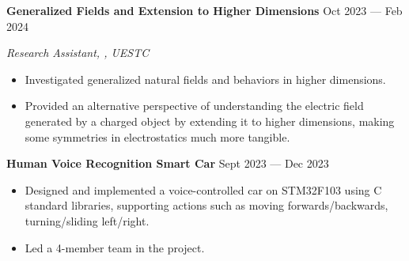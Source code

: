 \documentclass[a4paper,11pt]{article}
\newcommand{\MYhref}[3][black]{\href{#2}{\color{#1}{#3}}}%
\begin{document}







\textbf{Generalized Fields and Extension to Higher Dimensions} \hfill Oct 2023 --- Feb 2024

\vspace{-0.5em} \begin{small} \textit{Research Assistant, \MYhref{https://en.uestc.edu.cn/info/1074/3699.htm}{Professor Yidong Liu}, UESTC} \end{small} \vspace{-0.5em}

\begin{itemize}
    \setlength\itemsep{-0.5em}
    \item Investigated generalized natural fields and behaviors in higher dimensions.
    \item  Provided an alternative perspective of understanding the electric field generated by a charged object by extending it to higher dimensions, making some symmetries in electrostatics much more tangible.
\end{itemize}

\textbf{Human Voice Recognition Smart Car} \hfill Sept 2023 --- Dec 2023

\begin{itemize}
    \setlength\itemsep{-0.5em}
    \item Designed and implemented a voice-controlled car on STM32F103 using C standard libraries, supporting actions such as moving forwards/backwards, turning/sliding left/right.
    \item Led a 4-member team in the project.
\end{itemize}
\end{document}
